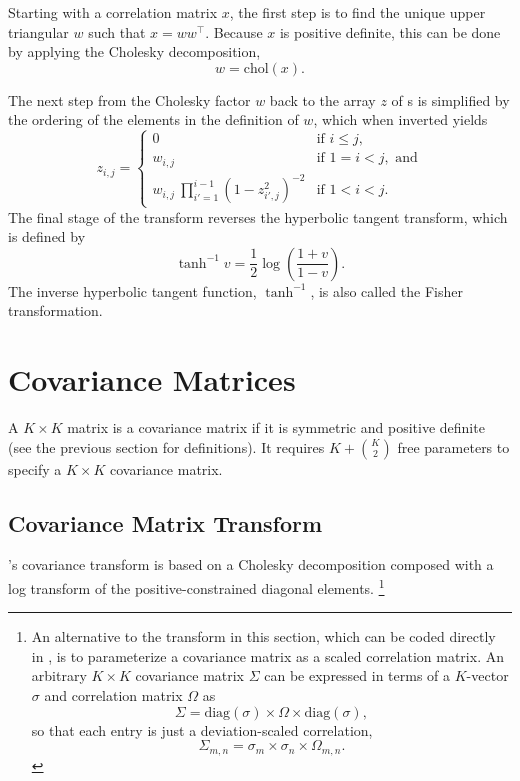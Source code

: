 Starting with a correlation matrix $x$, the first step is to find the
unique upper triangular $w$ such that $x = w w^{\top}$.  Because $x$
is positive definite, this can be done by applying the Cholesky
decomposition,
\[
w = \mbox{chol}(x).
\]


The next step from the Cholesky factor $w$ back to the array $z$ of
{\CPC}s is simplified by the ordering of the elements in the
definition of $w$, which when inverted yields
%
\[
z_{i,j} =
\left\{
\begin{array}{cl}
0 & \mbox{if } i \leq j,
\\[8pt]
w_{i,j} & \mbox{if } 1 = i < j, \mbox{ and}
\\[8pt]
{w_{i,j}}
\
\prod_{i'=1}^{i-1} \left( 1 - z_{i'\!,j}^2 \right)^{-2}
& \mbox{if } 1 < i < j.
\end{array}
\right.
\]
The final stage of the transform reverses the hyperbolic tangent
transform, which is defined by 
\[
\tanh^{-1} v = \frac{1}{2} \log \left( \frac{1 + v}{1 - v} \right).
\]
The inverse hyperbolic tangent function, $\tanh^{-1}$, is also called
the Fisher transformation.


\section{Covariance Matrices}

A $K \times K$ matrix is a covariance matrix if it is symmetric and
positive definite (see the previous section for definitions).  It
requires $K + \binom{K}{2}$ free parameters to specify a $K \times K$
covariance matrix.


\subsection{Covariance Matrix Transform}

\Stan's covariance transform is based on a Cholesky decomposition
composed with a log transform of the positive-constrained diagonal
elements.%
%
\footnote{An alternative to the transform in this section, which can
  be coded directly in \Stan, is to parameterize a covariance matrix
  as a scaled correlation matrix.  An arbitrary $K \times K$
  covariance matrix $\Sigma$ can be expressed in terms of a $K$-vector
  $\sigma$ and correlation matrix $\Omega$ as
  \[
  \Sigma = \mbox{diag}(\sigma) \times \Omega \times \mbox{diag}(\sigma),
  \]
  so that each entry is just a deviation-scaled correlation,
  \[
  \Sigma_{m,n} = \sigma_m \times \sigma_n \times \Omega_{m,n}.
  \]
}

